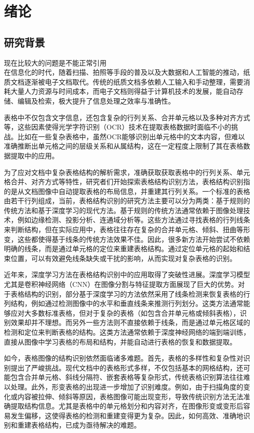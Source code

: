 \documentclass[../article.tex]{subfiles} %
\begin{document}
\section{绪论}
\subsection{研究背景}
现在比较大的问题是不能正常引用\\
在信息化的时代，随着扫描、拍照等手段的普及以及大数据和人工智能的推动，纸质文档逐渐被电子文档取代。传统的纸质文档多依赖人工输入和手动整理，需要消耗大量人力资源与时间成本，而电子文档则得益于计算机技术的发展，能自动存储、编辑及检索，极大提升了信息处理之效率与准确性。

表格中不仅包含文字信息，还包含复杂的行列关系、合并单元格以及多种对齐方式等，这些因素使得光学字符识别（OCR）\cite{b1, b2}技术在提取表格数据时面临不小的挑战。比如在一些复杂表格中，虽然OCR能够识别出单元格中的文本内容，但难以准确推断出单元格之间的层级关系和从属结构，这在一定程度上限制了其在表格数据提取中的应用。

为了应对文档中复杂表格结构的解析需求，准确获取获取表格中的行列关系、单元格合并、对齐方式等特性，研究者们开始探索表格结构识别方法，表格结构识别指的是从文档图像中自动提取表格的布局信息，并重建其行列关系。一个标准的表格由若干行列组成，当前，表格结构识别的研究方法主要可以分为两类：基于规则的传统方法和基于深度学习的现代方法。基于规则的传统方法通常依赖于图像处理技术，例如边缘检测、投影分析、连通域分析等\cite{b3}。这些方法通过寻找表格的行列线条来判断结构，但在实际应用中，表格往往存在复杂的合并单元格、倾斜、扭曲等形变，这些都使得基于线条的传统方法效果不佳。因此，很多新方法开始尝试不依赖明确的线条，而是通过单元格的定位来重建表格结构。通过定位单元格的起始和结束位置，可以有效避免线条缺失或干扰的影响，从而实现对复杂表格的识别。

近年来，深度学习方法在表格结构识别中的应用取得了突破性进展\cite{b3}。深度学习模型尤其是卷积神经网络（CNN）在图像分割与特征提取方面展现了巨大的优势。对于表格结构的识别，部分基于深度学习的方法依然采用了线条检测来恢复表格的行列结构，例如通过检测图像中的水平和垂直线条来推测行列划分。这类方法通常能够应对大多数标准表格，但对于复杂的表格（如包含合并单元格或倾斜表格），识别效果却并不理想。而另外一些方法则不直接依赖于线条，而是通过单元格区域的检测和定位来判断表格的结构\cite{b3}。这类方法通常依赖于深度神经网络的端到端训练，直接从图像中学习表格的布局和结构，并能自动进行表格的恢复和数据提取。

如今，表格图像的结构识别依然面临诸多难题。首先，表格的多样性和复杂性对识别提出了严峻挑战。现代文档中的表格形式多样，不仅包括基本的网格结构，还可能包含合并单元格、斜线分隔符、嵌套表格等复杂形式，传统表格识别算法往往难以处理。此外，形变表格的出现进一步增加了识别难度。例如，由于扫描角度的变化或内容被拉伸、倾斜等原因，表格图像可能出现变形，导致传统识别方法无法准确提取结构信息。尤其是表格中的单元格划分和内容对齐，在图像形变或变形后容易发生偏移，这使得表格的检测和重建变得更为复杂。因此，如何高效、准确地识别和重建表格结构，已成为亟待解决的难题。
\end{document}
